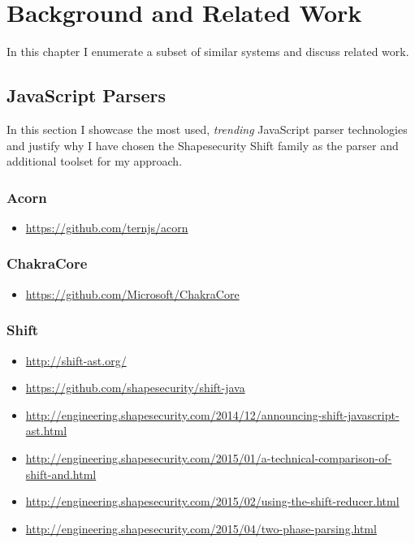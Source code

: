 \chapter{Background and Related Work}
\label{chap:background-and-related-work}

In this chapter I enumerate a subset of similar systems and discuss related work.

\section{JavaScript Parsers}
\label{sect:javascript-parsers}
In this section I showcase the most used, \emph{trending} JavaScript parser technologies and justify why I have chosen the Shapesecurity Shift family as the parser and additional toolset for my approach.

\subsection{Acorn}
\begin{itemize}
	\item \url{https://github.com/ternjs/acorn}
\end{itemize}


\subsection{ChakraCore}
\begin{itemize}
	\item \url{https://github.com/Microsoft/ChakraCore}
\end{itemize}


\subsection{Shift}
\label{sect:shift}
\begin{itemize}
	\item \url{http://shift-ast.org/}
	\item \url{https://github.com/shapesecurity/shift-java}
	\item \url{http://engineering.shapesecurity.com/2014/12/announcing-shift-javascript-ast.html}
	\item \url{http://engineering.shapesecurity.com/2015/01/a-technical-comparison-of-shift-and.html}
	\item \url{http://engineering.shapesecurity.com/2015/02/using-the-shift-reducer.html}
	\item \url{http://engineering.shapesecurity.com/2015/04/two-phase-parsing.html}
\end{itemize}

